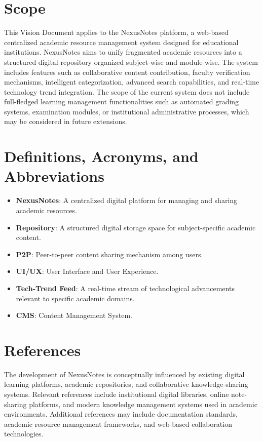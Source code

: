 \documentclass[12pt,a4paper]{report}
\begin{document}
\section{Scope}
This Vision Document applies to the NexusNotes platform, a web-based centralized academic resource management system designed for educational institutions. NexusNotes aims to unify fragmented academic resources into a structured digital repository organized subject-wise and module-wise. The system includes features such as collaborative content contribution, faculty verification mechanisms, intelligent categorization, advanced search capabilities, and real-time technology trend integration. The scope of the current system does not include full-fledged learning management functionalities such as automated grading systems, examination modules, or institutional administrative processes, which may be considered in future extensions.

\section{Definitions, Acronyms, and Abbreviations}
\begin{itemize}
    \item \textbf{NexusNotes}: A centralized digital platform for managing and sharing academic resources.
    \item \textbf{Repository}: A structured digital storage space for subject-specific academic content.
    \item \textbf{P2P}: Peer-to-peer content sharing mechanism among users.
    \item \textbf{UI/UX}: User Interface and User Experience.
    \item \textbf{Tech-Trend Feed}: A real-time stream of technological advancements relevant to specific academic domains.
    \item \textbf{CMS}: Content Management System.
\end{itemize}

\section{References}
The development of NexusNotes is conceptually influenced by existing digital learning platforms, academic repositories, and collaborative knowledge-sharing systems. Relevant references include institutional digital libraries, online note-sharing platforms, and modern knowledge management systems used in academic environments. Additional references may include documentation standards, academic resource management frameworks, and web-based collaboration technologies.
\end{document}
